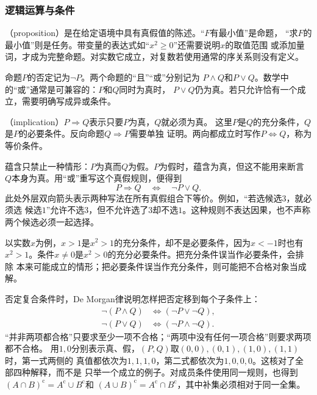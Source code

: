 \subsubsection{逻辑运算与条件}
\label{sec:prelim-logical-connectives}

（proposition）是在给定语境中具有真假值的陈述。“$F$有最小值”是命题，
“求$F$的最小值”则是任务。带变量的表达式如“$x^2\geq0$”还需要说明$x$的取值范围
或添加量词，才成为完整命题。对实数它成立，对复数若使用通常的序关系则没有定义。

命题$P$的否定记为$\neg P$。两个命题的“且”“或”分别记为
$P\land Q$和$P\lor Q$。数学中的“或”通常是可兼容的：$P$和$Q$同时为真时，
$P\lor Q$仍为真。若只允许恰有一个成立，需要明确写成异或条件。

（implication）$P\Rightarrow Q$表示只要$P$为真，$Q$就必须为真。
这里$P$是$Q$的充分条件，$Q$是$P$的必要条件。反向命题$Q\Rightarrow P$需要单独
证明。两向都成立时写作$P\Leftrightarrow Q$，称为等价条件。

蕴含只禁止一种情形：$P$为真而$Q$为假。$P$为假时，蕴含为真，但这不能用来断言
$Q$本身为真。用“或”重写这个真假规则，便得到
\begin{equation}
  P\Rightarrow Q\quad\Longleftrightarrow\quad\neg P\lor Q.
  \label{eq:comb-implication-clause}
\end{equation}
此处外层双向箭头表示两种写法在所有真假组合下等价。例如，“若选候选$3$，就必须选
候选$1$”允许不选$3$，但不允许选了$3$却不选$1$。这种规则不表达因果，也不声称
两个候选必须一起选择。

以实数$x$为例，$x>1$是$x^2>1$的充分条件，却不是必要条件，因为$x<-1$时也有
$x^2>1$。条件$x\neq0$是$x^2>0$的充分必要条件。把充分条件误当作必要条件，会排除
本来可能成立的情形；把必要条件误当作充分条件，则可能把不合格对象当成解。

否定复合条件时，De Morgan律说明怎样把否定移到每个子条件上：
\begin{equation}
  \begin{aligned}
    \neg(P\land Q)&\Longleftrightarrow(\neg P\lor\neg Q),\\
    \neg(P\lor Q)&\Longleftrightarrow(\neg P\land\neg Q).
  \end{aligned}
  \label{eq:comb-de-morgan}
\end{equation}
“并非两项都合格”只要求至少一项不合格；“两项中没有任何一项合格”则要求两项都不合格。
用$1,0$分别表示真、假，$(P,Q)$取$(0,0),(0,1),(1,0),(1,1)$时，第一式两侧的
真值都依次为$1,1,1,0$，第二式都依次为$1,0,0,0$。这核对了全部四种解释，而不是
只举一个成立的例子。对成员条件使用同一规则，也得到
$(A\cap B)^{\mathrm c}=A^{\mathrm c}\cup B^{\mathrm c}$和
$(A\cup B)^{\mathrm c}=A^{\mathrm c}\cap B^{\mathrm c}$，其中补集必须相对于同一全集。

